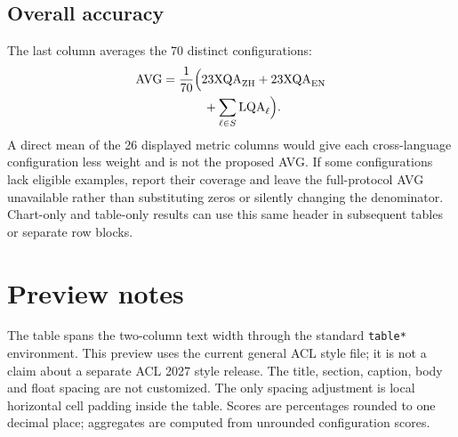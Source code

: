 \documentclass[11pt]{article}
\begin{document}
\subsection{Overall accuracy}
The last column averages the 70 distinct configurations:
\begin{equation*}
\begin{aligned}
\mathrm{AVG}={}&\frac{1}{70}\Bigl(23\mathrm{XQA}_{\mathrm{ZH}}+23\mathrm{XQA}_{\mathrm{EN}}\\
&\qquad+\sum_{\ell\in S}\mathrm{LQA}_{\ell}\Bigr).
\end{aligned}
\end{equation*}
A direct mean of the 26 displayed metric columns would give each
cross-language configuration less weight and is not the proposed AVG.
If some configurations lack eligible examples, report their coverage and
leave the full-protocol AVG unavailable rather than substituting zeros or
silently changing the denominator. Chart-only and table-only results can
use this same header in subsequent tables or separate row blocks.

\section{Preview notes}
The table spans the two-column text width through the standard
\texttt{table*} environment. This preview uses the current general ACL style
file; it is not a claim about a separate ACL 2027 style release.
The title, section, caption, body and float spacing are not customized.
The only spacing adjustment is local horizontal cell padding inside the
table. Scores are percentages rounded to one decimal place; aggregates are
computed from unrounded configuration scores.
\end{document}

